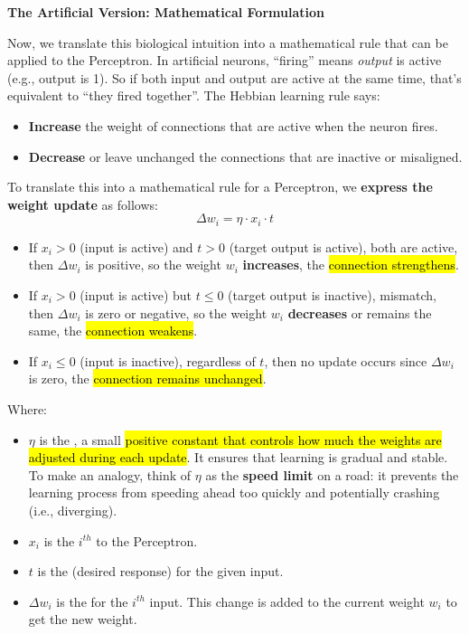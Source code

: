 \highspace
\begin{flushleft}
    \textcolor{Green3}{ \textbf{The Artificial Version: Mathematical Formulation}}
\end{flushleft}
Now, we translate this biological intuition into a mathematical rule that can be applied to the Perceptron. In artificial neurons, ``firing'' means \emph{output} is active (e.g., output is 1). So if both input and output are active at the same time, that's equivalent to ``they fired together''. The Hebbian learning rule says:
\begin{itemize}
    \item \textbf{Increase} the weight of connections that are active when the neuron fires.
    \item \textbf{Decrease} or leave unchanged the connections that are inactive or misaligned.
\end{itemize}
To translate this into a mathematical rule for a Perceptron, we \textbf{express the weight update} as follows:
\begin{equation}\label{eq:hebbian-weight-change}
    \Delta w_i = \eta \cdot x_i \cdot t
\end{equation}
\begin{itemize}
    \item If $x_{i} > 0$ (input is active) and $t > 0$ (target output is active), both are active, then $\Delta w_i$ is positive, so the weight $w_i$ \textbf{increases}, the \hl{connection strengthens}.
    \item If $x_{i} > 0$ (input is active) but $t \leq 0$ (target output is inactive), mismatch, then $\Delta w_i$ is zero or negative, so the weight $w_i$ \textbf{decreases} or remains the same, the \hl{connection weakens}.
    \item If $x_{i} \leq 0$ (input is inactive), regardless of $t$, then no update occurs since $\Delta w_i$ is zero, the \hl{connection remains unchanged}.
\end{itemize}
Where:
\begin{itemize}
    \item $\eta$ is the , a small \hl{positive constant that controls how much the weights are adjusted during each update}. It ensures that learning is gradual and stable. To make an analogy, think of $\eta$ as the \textbf{speed limit} on a road: it prevents the learning process from speeding ahead too quickly and potentially crashing (i.e., diverging).
    \item $x_{i}$ is the $i^{th}$  to the Perceptron.
    \item $t$ is the  (desired response) for the given input.
    \item $\Delta w_i$ is the  for the $i^{th}$ input. This change is added to the current weight $w_i$ to get the new weight.
\end{itemize}
